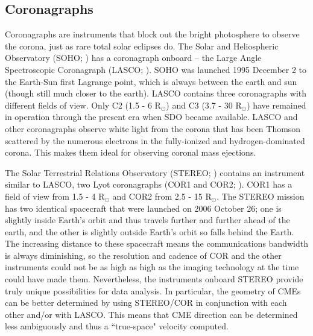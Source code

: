 \subsection{Coronagraphs}
Coronagraphs are instruments that block out the bright photosphere to observe the corona, just as rare total solar eclipses do. The Solar and Heliospheric Observatory (SOHO; \citealt{Domingo1995}) has a coronagraph onboard -- the Large Angle Spectroscopic Coronagraph (LASCO; \citealt{Brueckner1995}). SOHO was launched 1995 December 2 to the Earth-Sun first Lagrange point, which is always between the earth and sun (though still much closer to the earth). LASCO contains three coronagraphs with different fields of view. Only C2 (1.5 - 6 R$_\odot$) and C3 (3.7 - 30 R$_\odot$) have remained in operation through the present era when SDO became available. LASCO and other coronagraphs observe white light from the corona that has been Thomson scattered by the numerous electrons in the fully-ionized and hydrogen-dominated corona. This makes them ideal for observing coronal mass ejections. 

The Solar Terrestrial Relations Observatory (STEREO; \citealt{Kaiser2007}) contains an instrument similar to LASCO, two Lyot coronagraphs (COR1 and COR2; \citealt{Howard2008}). COR1 has a field of view from 1.5 - 4 R$_\odot$ and COR2 from 2.5 - 15 R$_\odot$. The STEREO mission has two identical spacecraft that were launched on 2006 October 26; one is slightly inside Earth's orbit and thus travels further and further ahead of the earth, and the other is slightly outside Earth's orbit so falls behind the Earth. The increasing distance to these spacecraft means the communications bandwidth is always diminishing, so the resolution and cadence of COR and the other instruments could not be as high as high as the imaging technology at the time could have made them. Nevertheless, the instruments onboard STEREO provide truly unique possibilities for data analysis. In particular, the geometry of CMEs can be better determined by using STEREO/COR in conjunction with each other and/or with LASCO. This means that CME direction can be determined less ambiguously and thus a ``true-space" velocity computed. 

